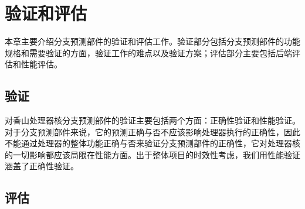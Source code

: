 \chapter{验证和评估}\label{chap:eval}
本章主要介绍分支预测部件的验证和评估工作。验证部分包括分支预测部件的功能规格和需要验证的方面，验证工作的难点以及验证方案；评估部分主要包括后端评估和性能评估。
\section{验证}
对香山处理器核分支预测部件的验证主要包括两个方面：正确性验证和性能验证。对于分支预测部件来说，它的预测正确与否不应该影响处理器执行的正确性，因此不能通过处理器的整体功能正确与否来验证分支预测部件的正确性，它对处理器核的一切影响都应该局限在性能方面。出于整体项目的时效性考虑，我们用性能验证涵盖了正确性验证。


\section{评估}
